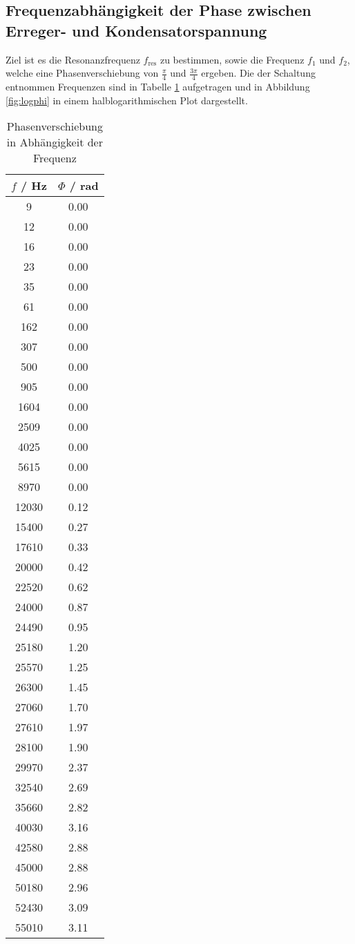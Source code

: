 \subsection{Frequenzabhängigkeit der Phase zwischen Erreger- und Kondensatorspannung}
Ziel ist es die Resonanzfrequenz $f_\text{res}$ zu bestimmen, sowie die Frequenz $f_1$ und $f_2$, welche eine Phasenverschiebung von $\frac{\pi}{4}$ und $\frac{3 \pi}{4}$ ergeben. Die der Schaltung entnommen Frequenzen sind in Tabelle \ref{tab:phi} aufgetragen und in Abbildung \ref{fig:logphi} in einem halblogarithmischen Plot dargestellt.
\begin{table}
  \centering
  \begin{tabular}{c c}
	\toprule
	$f$ / Hz & $\Phi$ / rad \\
	\midrule
	9   & 0.00 \\
	12  & 0.00 \\
	16  & 0.00 \\
	23  & 0.00 \\
	35  & 0.00 \\
	61  & 0.00 \\
	162 & 0.00 \\
	307 & 0.00 \\
	500 & 0.00 \\
	905 & 0.00 \\
	1604 & 0.00 \\
	2509 & 0.00 \\
	4025 & 0.00 \\
	5615 & 0.00 \\
	8970 & 0.00 \\
	12030 & 0.12 \\
	15400 & 0.27 \\
	17610 & 0.33 \\
	20000 & 0.42 \\
	22520 & 0.62 \\
	24000 & 0.87 \\
	24490 & 0.95 \\
	25180 & 1.20 \\
	25570 & 1.25 \\
	26300 & 1.45 \\
	27060 & 1.70 \\
	27610 & 1.97 \\
	28100 & 1.90 \\
	29970 & 2.37 \\
	32540 & 2.69 \\
	35660 & 2.82 \\
	40030 & 3.16 \\
	42580 & 2.88 \\
	45000 & 2.88 \\
	50180 & 2.96 \\
	52430 & 3.09 \\
	55010 & 3.11 \\
  \end{tabular}
  \caption{Phasenverschiebung in Abhängigkeit der Frequenz}
  \label{tab:phi}
\end{table}
